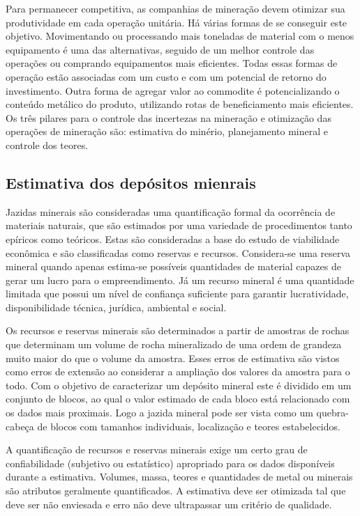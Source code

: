  Para permanecer competitiva, as companhias de mineração devem otimizar sua produtividade em cada operação unitária. Há várias formas de se conseguir este objetivo. Movimentando ou processando mais toneladas de material com o menos equipamento é uma das alternativas, seguido de um melhor controle das operações ou comprando equipamentos mais eficientes. Todas essas formas de operação estão associadas com um custo e  com um potencial de retorno do investimento. Outra forma de agregar valor ao commodite é potencializando o conteúdo metálico do produto, utilizando rotas de beneficiamento mais eficientes. 
 Os três pilares para o controle das incertezas na mineração e otimização das operações de mineração são: estimativa do minério, planejamento mineral e controle dos teores.
 
 \subsection{Estimativa dos depósitos mienrais}

Jazidas minerais são consideradas uma quantificação formal da ocorrência de materiais naturais, que são estimados por uma variedade de procedimentos tanto epíricos como teóricos. Estas são consideradas a base do estudo de viabilidade econômica  e são classificadas como reservas e recursos. Considera-se uma reserva mineral quando apenas estima-se possíveis quantidades de material capazes de gerar um lucro para o empreendimento. Já um recurso mineral é uma quantidade limitada que possui um nível de confiança suficiente para garantir lucratividade, disponibilidade técnica, jurídica, ambiental e social. 

Os recursos e reservas minerais são determinados a partir de amostras de rochas que determinam um volume de rocha mineralizado de uma ordem de grandeza muito maior do que o volume da amostra. Esses erros de estimativa são vistos como erros de extensão ao considerar a ampliação dos valores da amostra para o todo. Com o objetivo de caracterizar um depósito mineral este é dividido em um conjunto de blocos, ao qual o valor estimado de cada bloco está relacionado com os dados mais proximais. Logo a jazida mineral pode ser vista como um quebra-cabeça de blocos com tamanhos individuais, localização e teores estabelecidos.

A quantificação de recursos e reservas minerais exige um certo grau de confiabilidade (subjetivo ou estatístico) apropriado para os dados disponíveis durante a estimativa. Volumes, massa, teores e quantidades de metal ou minerais são atributos geralmente quantificados. A estimativa deve ser otimizada tal que deve ser não enviesada e erro não deve ultrapassar um critério de qualidade. 

